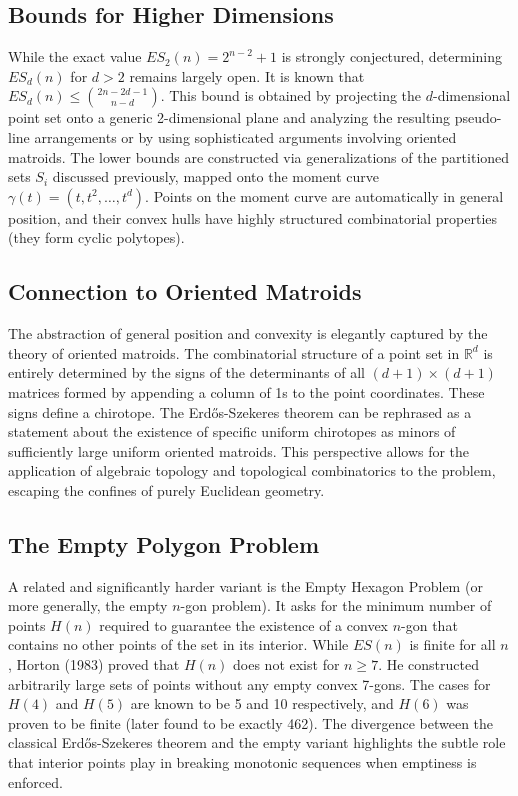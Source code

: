 \documentclass[11pt,a4paper]{article}
\begin{document}
\subsection{Bounds for Higher Dimensions}
While the exact value $ES_2(n) = 2^{n-2} + 1$ is strongly conjectured, determining $ES_d(n)$ for $d > 2$ remains largely open.
It is known that $ES_d(n) \le \binom{2n-2d-1}{n-d}$. This bound is obtained by projecting the $d$-dimensional point set onto a generic 2-dimensional plane and analyzing the resulting pseudo-line arrangements or by using sophisticated arguments involving oriented matroids.
The lower bounds are constructed via generalizations of the partitioned sets $S_i$ discussed previously, mapped onto the moment curve $\gamma(t) = (t, t^2, \dots, t^d)$. Points on the moment curve are automatically in general position, and their convex hulls have highly structured combinatorial properties (they form cyclic polytopes).

\subsection{Connection to Oriented Matroids}
The abstraction of general position and convexity is elegantly captured by the theory of oriented matroids. The combinatorial structure of a point set in $\mathbb{R}^d$ is entirely determined by the signs of the determinants of all $(d+1) \times (d+1)$ matrices formed by appending a column of 1s to the point coordinates.
These signs define a chirotope. The Erd\H{o}s-Szekeres theorem can be rephrased as a statement about the existence of specific uniform chirotopes as minors of sufficiently large uniform oriented matroids.
This perspective allows for the application of algebraic topology and topological combinatorics to the problem, escaping the confines of purely Euclidean geometry.

\subsection{The Empty Polygon Problem}
A related and significantly harder variant is the Empty Hexagon Problem (or more generally, the empty $n$-gon problem). It asks for the minimum number of points $H(n)$ required to guarantee the existence of a convex $n$-gon that contains no other points of the set in its interior.
While $ES(n)$ is finite for all $n$, Horton (1983) proved that $H(n)$ does not exist for $n \ge 7$. He constructed arbitrarily large sets of points without any empty convex 7-gons. The cases for $H(4)$ and $H(5)$ are known to be 5 and 10 respectively, and $H(6)$ was proven to be finite (later found to be exactly 462).
The divergence between the classical Erd\H{o}s-Szekeres theorem and the empty variant highlights the subtle role that interior points play in breaking monotonic sequences when emptiness is enforced.
\end{document}
